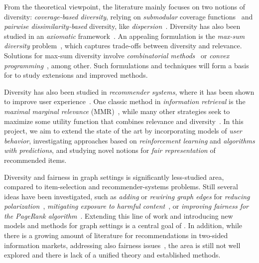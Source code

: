 \documentclass[a4paper,11pt]{article}
\begin{document}
From the theoretical viewpoint, the literature mainly focuses on two notions of diversity: 
\emph{coverage-based diversity}, relying on \emph{submodular} coverage functions~\cite{bach2013learning} 
and \emph{pairwise dissimilarity-based} diversity, like \emph{dispersion}~\cite{hassin1997approximation}.
Diversity has also been studied in an \emph{axiomatic} framework~\cite{gollapudi2009axiomatic}. 
An appealing formulation is the \emph{max-sum diversity} problem~\cite{borodin2012max},
which captures trade-offs between diversity and relevance.
Solutions for max-sum diversity involve \emph{combinatorial methods}~\cite{borodin2012max} or
\emph{convex programming}~\cite{cevallos2016max}, 
among other.
Such formulations and techniques will form a basis for {\acronym}
to study extensions and improved methods. 


Diversity has also been studied in \emph{recommender systems},
where it has been shown to improve user experience~\cite{Castells2022}.
One classic method in \emph{information retrieval}
is the \emph{maximal marginal relevance} (MMR)~\cite{MMR}, 
while many other strategies seek to 
maximize some utility function that combines relevance and diversity~\cite{DUM,DPMF}.
In this project, we aim to extend the state of the art 
by incorporating models of \emph{user behavior}, 
investigating approaches based on \emph{reinforcement learning} and \emph{algorithms with predictions}, 
and studying novel notions for \emph{fair representation} of recommended items. 


Diversity and fairness in graph settings is significantly less-studied area,
compared to item-selection and recommender-systems problems.
Still several ideas have been investigated, 
such as \emph{adding} or \emph{rewiring graph edges} for
\emph{reducing polarization}~\cite{adriaens2023minimizing,cinus2023rebalancing,haddadan2022reducing},
\emph{mitigating exposure to harmful content}~\cite{coupette2023reducing,fabbri2022rewiring}, 
or \emph{improving fairness for the Page\-Rank algorithm}~\cite{tsioutsiouliklis2022link}.
Extending this line of work and introducing new models and methods for graph settings
is a central goal of \acronym.
In addition, while there is a growing amount of literature for 
recommendations in two-sided information markets,
addressing also fairness issues~\cite{do2021two,wang2021user}, 
the area is still not well explored and there is lack of a unified theory
and established methods.
\end{document}
